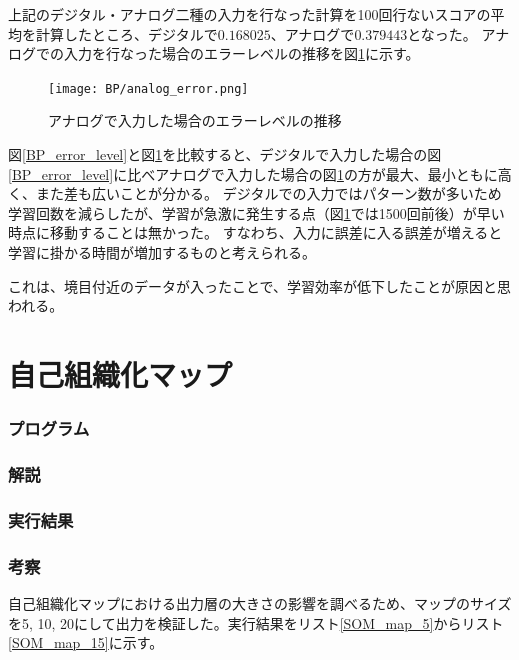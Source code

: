 \documentclass{jsarticle}
\begin{document}
上記のデジタル・アナログ二種の入力を行なった計算を100回行ないスコアの平均を計算したところ、デジタルで$0.168025$、アナログで$0.379443$となった。
アナログでの入力を行なった場合のエラーレベルの推移を図\ref{BP_analog_error}に示す。
\begin{figure}[H]
	\begin{center}
		\texttt{[image: BP/analog\_error.png]}
		\caption{アナログで入力した場合のエラーレベルの推移\label{BP_analog_error}}
	\end{center}
\end{figure}
図\ref{BP_error_level}と図\ref{BP_analog_error}を比較すると、デジタルで入力した場合の図\ref{BP_error_level}に比べアナログで入力した場合の図\ref{BP_analog_error}の方が最大、最小ともに高く、また差も広いことが分かる。
デジタルでの入力ではパターン数が多いため学習回数を減らしたが、学習が急激に発生する点（図\ref{BP_analog_error}では1500回前後）が早い時点に移動することは無かった。
すなわち、入力に誤差に入る誤差が増えると学習に掛かる時間が増加するものと考えられる。

これは、境目付近のデータが入ったことで、学習効率が低下したことが原因と思われる。


\part{自己組織化マップ}
\section{プログラム}


\section{解説}


\section{実行結果}


\section{考察}
自己組織化マップにおける出力層の大きさの影響を調べるため、マップのサイズを5, 10, 20にして出力を検証した。実行結果をリスト\ref{SOM_map_5}からリスト\ref{SOM_map_15}に示す。




\end{document}
